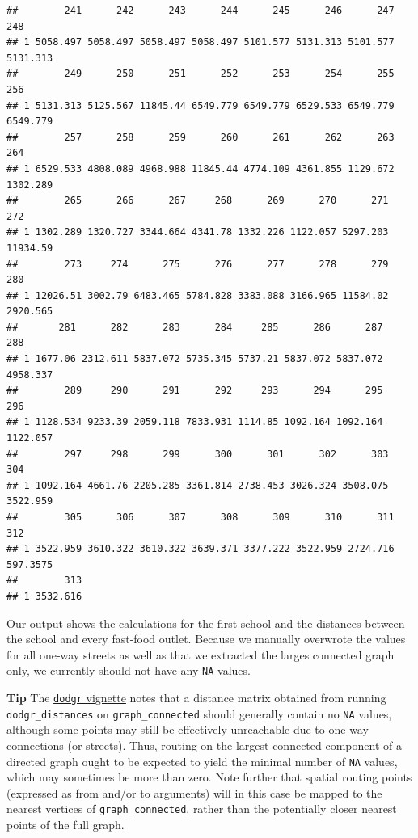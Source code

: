 \documentclass[
]{book}
\begin{document}
\begin{verbatim}
##        241      242      243      244      245      246      247      248
## 1 5058.497 5058.497 5058.497 5058.497 5101.577 5131.313 5101.577 5131.313
##        249      250      251      252      253      254      255      256
## 1 5131.313 5125.567 11845.44 6549.779 6549.779 6529.533 6549.779 6549.779
##        257      258      259      260      261      262      263      264
## 1 6529.533 4808.089 4968.988 11845.44 4774.109 4361.855 1129.672 1302.289
##        265      266      267     268      269      270      271      272
## 1 1302.289 1320.727 3344.664 4341.78 1332.226 1122.057 5297.203 11934.59
##        273     274      275      276      277      278      279      280
## 1 12026.51 3002.79 6483.465 5784.828 3383.088 3166.965 11584.02 2920.565
##       281      282      283      284     285      286      287      288
## 1 1677.06 2312.611 5837.072 5735.345 5737.21 5837.072 5837.072 4958.337
##        289     290      291      292     293      294      295      296
## 1 1128.534 9233.39 2059.118 7833.931 1114.85 1092.164 1092.164 1122.057
##        297     298      299      300      301      302      303      304
## 1 1092.164 4661.76 2205.285 3361.814 2738.453 3026.324 3508.075 3522.959
##        305      306      307      308      309      310      311      312
## 1 3522.959 3610.322 3610.322 3639.371 3377.222 3522.959 2724.716 597.3575
##        313
## 1 3532.616
\end{verbatim}

Our output shows the calculations for the first school and the distances between the school and every fast-food outlet. Because we manually overwrote the values for all one-way streets as well as that we extracted the larges connected graph only, we currently should not have any \texttt{NA} values.

\textbf{Tip}
The \href{https://cran.r-project.org/web/packages/dodgr/vignettes/dodgr.html\#4_Distance_Matrices:_dodgr_dists()}{\texttt{dodgr} vignette} notes that
a distance matrix obtained from running \texttt{dodgr\_distances} on \texttt{graph\_connected} should generally contain no \texttt{NA} values, although some points may still be effectively unreachable due to one-way connections (or streets). Thus, routing on the largest connected component of a directed graph ought to be expected to yield the minimal number of \texttt{NA} values, which may sometimes be more than zero. Note further that spatial routing points (expressed as from and/or to arguments) will in this case be mapped to the nearest vertices of \texttt{graph\_connected}, rather than the potentially closer nearest points of the full graph.
\end{document}
